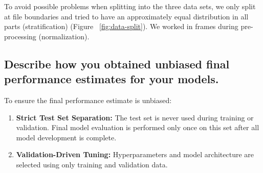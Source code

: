To avoid possible problems when splitting into the three data sets, 
we only split at file boundaries and tried to have an approximately equal distribution in all parts (stratification)  (Figure ~\ref{fig:data-split}).
We worked in frames during pre-processing (normalization).




\subsection{Describe how you obtained unbiased final performance estimates for your models. }
\label{sec:Data Split:c}

To ensure the final performance estimate is unbiased:

\begin{enumerate}
	\item {\bf Strict Test Set Separation: } The test set is never used during training or validation. Final model evaluation is performed only once on this set after all model development is complete.
	
	\item {\bf Validation-Driven Tuning: } Hyperparameters and model architecture are selected using only training and validation data. 
%	
%
\end{enumerate}




